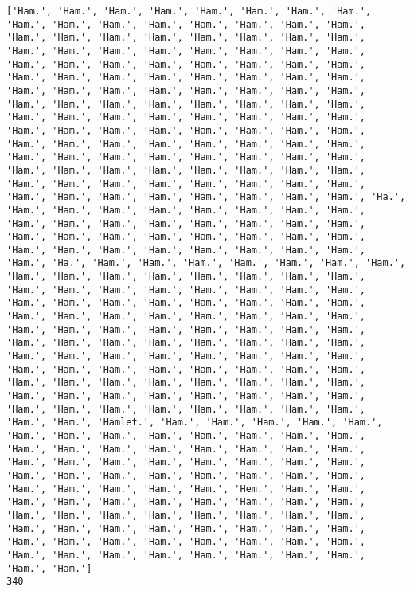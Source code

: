 \documentclass[11pt]{article}
\begin{document}
    \begin{Verbatim}[commandchars=\\\{\}]
['Ham.', 'Ham.', 'Ham.', 'Ham.', 'Ham.', 'Ham.', 'Ham.', 'Ham.', 'Ham.', 'Ham.', 'Ham.', 'Ham.', 'Ham.', 'Ham.', 'Ham.', 'Ham.', 'Ham.', 'Ham.', 'Ham.', 'Ham.', 'Ham.', 'Ham.', 'Ham.', 'Ham.', 'Ham.', 'Ham.', 'Ham.', 'Ham.', 'Ham.', 'Ham.', 'Ham.', 'Ham.', 'Ham.', 'Ham.', 'Ham.', 'Ham.', 'Ham.', 'Ham.', 'Ham.', 'Ham.', 'Ham.', 'Ham.', 'Ham.', 'Ham.', 'Ham.', 'Ham.', 'Ham.', 'Ham.', 'Ham.', 'Ham.', 'Ham.', 'Ham.', 'Ham.', 'Ham.', 'Ham.', 'Ham.', 'Ham.', 'Ham.', 'Ham.', 'Ham.', 'Ham.', 'Ham.', 'Ham.', 'Ham.', 'Ham.', 'Ham.', 'Ham.', 'Ham.', 'Ham.', 'Ham.', 'Ham.', 'Ham.', 'Ham.', 'Ham.', 'Ham.', 'Ham.', 'Ham.', 'Ham.', 'Ham.', 'Ham.', 'Ham.', 'Ham.', 'Ham.', 'Ham.', 'Ham.', 'Ham.', 'Ham.', 'Ham.', 'Ham.', 'Ham.', 'Ham.', 'Ham.', 'Ham.', 'Ham.', 'Ham.', 'Ham.', 'Ham.', 'Ham.', 'Ham.', 'Ham.', 'Ham.', 'Ham.', 'Ham.', 'Ham.', 'Ham.', 'Ham.', 'Ham.', 'Ham.', 'Ham.', 'Ham.', 'Ham.', 'Ham.', 'Ham.', 'Ham.', 'Ham.', 'Ham.', 'Ham.', 'Ham.', 'Ham.', 'Ham.', 'Ha.', 'Ham.', 'Ham.', 'Ham.', 'Ham.', 'Ham.', 'Ham.', 'Ham.', 'Ham.', 'Ham.', 'Ham.', 'Ham.', 'Ham.', 'Ham.', 'Ham.', 'Ham.', 'Ham.', 'Ham.', 'Ham.', 'Ham.', 'Ham.', 'Ham.', 'Ham.', 'Ham.', 'Ham.', 'Ham.', 'Ham.', 'Ham.', 'Ham.', 'Ham.', 'Ham.', 'Ham.', 'Ham.', 'Ham.', 'Ha.', 'Ham.', 'Ham.', 'Ham.', 'Ham.', 'Ham.', 'Ham.', 'Ham.', 'Ham.', 'Ham.', 'Ham.', 'Ham.', 'Ham.', 'Ham.', 'Ham.', 'Ham.', 'Ham.', 'Ham.', 'Ham.', 'Ham.', 'Ham.', 'Ham.', 'Ham.', 'Ham.', 'Ham.', 'Ham.', 'Ham.', 'Ham.', 'Ham.', 'Ham.', 'Ham.', 'Ham.', 'Ham.', 'Ham.', 'Ham.', 'Ham.', 'Ham.', 'Ham.', 'Ham.', 'Ham.', 'Ham.', 'Ham.', 'Ham.', 'Ham.', 'Ham.', 'Ham.', 'Ham.', 'Ham.', 'Ham.', 'Ham.', 'Ham.', 'Ham.', 'Ham.', 'Ham.', 'Ham.', 'Ham.', 'Ham.', 'Ham.', 'Ham.', 'Ham.', 'Ham.', 'Ham.', 'Ham.', 'Ham.', 'Ham.', 'Ham.', 'Ham.', 'Ham.', 'Ham.', 'Ham.', 'Ham.', 'Ham.', 'Ham.', 'Ham.', 'Ham.', 'Ham.', 'Ham.', 'Ham.', 'Ham.', 'Ham.', 'Ham.', 'Ham.', 'Ham.', 'Ham.', 'Ham.', 'Ham.', 'Ham.', 'Ham.', 'Ham.', 'Ham.', 'Ham.', 'Ham.', 'Ham.', 'Ham.', 'Ham.', 'Ham.', 'Ham.', 'Ham.', 'Hamlet.', 'Ham.', 'Ham.', 'Ham.', 'Ham.', 'Ham.', 'Ham.', 'Ham.', 'Ham.', 'Ham.', 'Ham.', 'Ham.', 'Ham.', 'Ham.', 'Ham.', 'Ham.', 'Ham.', 'Ham.', 'Ham.', 'Ham.', 'Ham.', 'Ham.', 'Ham.', 'Ham.', 'Ham.', 'Ham.', 'Ham.', 'Ham.', 'Ham.', 'Ham.', 'Ham.', 'Ham.', 'Ham.', 'Ham.', 'Ham.', 'Ham.', 'Ham.', 'Ham.', 'Ham.', 'Ham.', 'Ham.', 'Ham.', 'Ham.', 'Hem.', 'Ham.', 'Ham.', 'Ham.', 'Ham.', 'Ham.', 'Ham.', 'Ham.', 'Ham.', 'Ham.', 'Ham.', 'Ham.', 'Ham.', 'Ham.', 'Ham.', 'Ham.', 'Ham.', 'Ham.', 'Ham.', 'Ham.', 'Ham.', 'Ham.', 'Ham.', 'Ham.', 'Ham.', 'Ham.', 'Ham.', 'Ham.', 'Ham.', 'Ham.', 'Ham.', 'Ham.', 'Ham.', 'Ham.', 'Ham.', 'Ham.', 'Ham.', 'Ham.', 'Ham.', 'Ham.', 'Ham.', 'Ham.', 'Ham.', 'Ham.', 'Ham.']
340

    \end{Verbatim}
\end{document}

